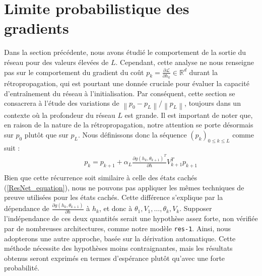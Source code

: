 \section{Limite probabilistique des gradients}\label{lim_proba_grad}

Dans la section précédente, nous avons étudié le comportement de la sortie du réseau pour des valeurs élevées de $L$. Cependant, cette analyse ne nous renseigne pas sur le comportement du gradient du coût $p_k = \frac{\partial \mathscr{L}}{\partial h_k} \in \mathbb{R}^d$ durant la rétropropagation, qui est pourtant une donnée cruciale pour évaluer la capacité d'entraînement du réseau à l'initialisation. Par conséquent, cette section se consacrera à l'étude des variations de $\left\| p_0 - p_L \right\| / \left\| p_L \right\|$, toujours dans un contexte où la profondeur du réseau $L$ est grande. Il est important de noter que, en raison de la nature de la rétropropagation, notre attention se porte désormais sur $p_0$ plutôt que sur $p_L$. Nous définissons donc la séquence $(p_k)_{0 \leq k \leq L}$ comme suit :
\begin{align*}
    \qquad & p_k = p_{k+1} + \alpha _L \frac{\partial g(h_k, \theta _{k+1}) ^T}{\partial h}  V_{k+1}^T p_{k+1} \\
\end{align*}
Bien que cette récurrence soit similaire à celle des états cachés (\cref{ResNet_equation}), nous ne pouvons pas appliquer les mêmes techniques de preuve utilisées pour les états cachés. Cette différence s'explique par la dépendance de $\frac{\partial g(h_k, \theta_{k+1})}{\partial h}$ à $h_k$, et donc à $\theta_1, V_1, \dots, \theta_k, V_k$. Supposer l'indépendance de ces deux quantités serait une hypothèse assez forte, non vérifiée par de nombreuses architectures, comme notre modèle \texttt{res-1}. Ainsi, nous adopterons une autre approche, basée sur la dérivation automatique. Cette méthode nécessite des hypothèses moins contraignantes, mais les résultats obtenus seront exprimés en termes d'espérance plutôt qu'avec une forte probabilité.


